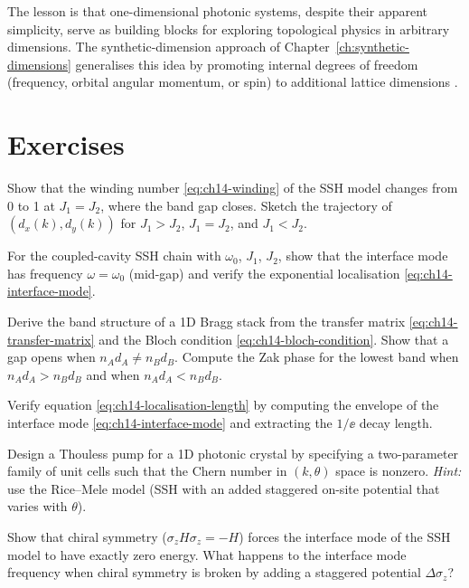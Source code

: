 The lesson is that one-dimensional photonic systems, despite their
apparent simplicity, serve as building blocks for exploring topological
physics in arbitrary dimensions.  The synthetic-dimension approach of
Chapter~\ref{ch:synthetic-dimensions} generalises this idea by
promoting internal degrees of freedom (frequency, orbital angular
momentum, or spin) to additional lattice dimensions
\cite{kim2020recent,guglielmon2017photonic}.

\section*{Exercises}

\begin{exercise}
  Show that the winding number \eqref{eq:ch14-winding} of the SSH model
  changes from 0 to 1 at $J_1=J_2$, where the band gap closes.
  Sketch the trajectory of $(d_x(k),d_y(k))$ for $J_1>J_2$, $J_1=J_2$,
  and $J_1<J_2$.
\end{exercise}

\begin{exercise}
  For the coupled-cavity SSH chain with $\omega_0$, $J_1$, $J_2$, show
  that the interface mode has frequency $\omega=\omega_0$ (mid-gap) and
  verify the exponential localisation \eqref{eq:ch14-interface-mode}.
\end{exercise}

\begin{exercise}
  Derive the band structure of a 1D Bragg stack from the transfer
  matrix \eqref{eq:ch14-transfer-matrix} and the Bloch condition
  \eqref{eq:ch14-bloch-condition}.  Show that a gap opens when
  $n_Ad_A\neq n_Bd_B$.  Compute the Zak phase for the lowest band
  when $n_Ad_A>n_Bd_B$ and when $n_Ad_A<n_Bd_B$.
\end{exercise}

\begin{exercise}
  Verify equation \eqref{eq:ch14-localisation-length} by computing the
  envelope of the interface mode \eqref{eq:ch14-interface-mode} and
  extracting the $1/\ee$ decay length.
\end{exercise}

\begin{exercise}
  Design a Thouless pump for a 1D photonic crystal by specifying a
  two-parameter family of unit cells such that the Chern number in
  $(k,\theta)$ space is nonzero.  \emph{Hint:} use the Rice--Mele
  model (SSH with an added staggered on-site potential that varies
  with $\theta$).
\end{exercise}

\begin{exercise}
  Show that chiral symmetry ($\sigma_z H\sigma_z=-H$) forces the
  interface mode of the SSH model to have exactly zero energy.  What
  happens to the interface mode frequency when chiral symmetry is
  broken by adding a staggered potential $\Delta\sigma_z$?
\end{exercise}
